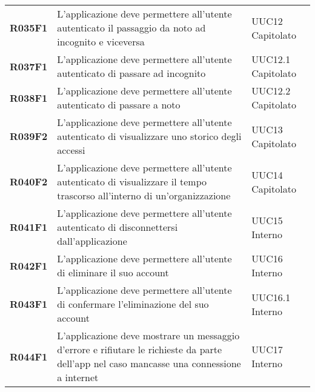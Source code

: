 \documentclass[../analisi-dei-requisiti.tex]{subfiles}
\begin{document}
\begin{longtable}[H]{>{\centering\bfseries}m{3cm} >{\centering}m{10cm} >{\centering\arraybackslash}m{3cm}}
  R035F1                               & L'applicazione deve permettere all'utente autenticato il passaggio da noto ad incognito e viceversa                                                                                                     & UUC12 Capitolato              \\
  R037F1                               & L'applicazione deve permettere all'utente autenticato di passare ad incognito                                                                                                                           & UUC12.1 Capitolato           \\
  R038F1                               & L'applicazione deve permettere all'utente autenticato di passare a noto                                                                                                                                 & UUC12.2 Capitolato           \\
  R039F2                               & L'applicazione deve permettere all'utente autenticato di visualizzare uno storico degli accessi                                                                                                         & UUC13 Capitolato               \\
  R040F2                               & L'applicazione deve permettere all'utente autenticato di visualizzare il tempo trascorso all'interno di un'organizzazione                                                                               & UUC14 Capitolato               \\
  R041F1                               & L'applicazione deve permettere all'utente autenticato di disconnettersi dall'applicazione                                                                                                               & UUC15 Interno                  \\
  R042F1                               & L'applicazione deve permettere all'utente di eliminare il suo account                                                                                                                                   & UUC16 Interno                 \\
  R043F1                               & L'applicazione deve permettere all'utente di confermare l'eliminazione del suo account                                                                                                                  & UUC16.1 Interno               \\
  R044F1                               & L'applicazione deve mostrare un messaggio d'errore e rifiutare le richieste da parte dell'app nel caso mancasse una connessione a internet                                                              & UUC17 Interno                 \\


\end{longtable}
\end{document}
